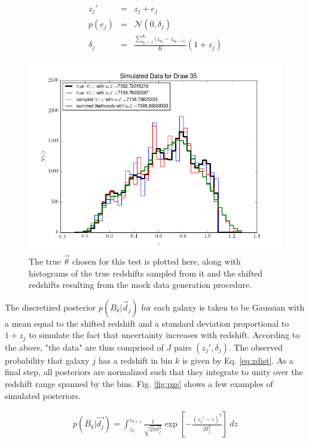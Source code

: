 \documentclass[12pt, onecolumn]{emulateapj}
\begin{document}
\begin{mathletters}
\begin{eqnarray}
\label{eq:zshift}
z_{j}' &=& z_{j}+e_{j}\\
p(e_{j}) &=& \mathcal{N}(0,\delta_{j})\nonumber\\
\delta_{j} &=& \frac{\sum_{b_{k}=1}^{K}(z_{b_{k}}-z_{b_{k}-1)}}{K}(1+z_{j})\nonumber
\end{eqnarray}
\end{mathletters}

\begin{figure}
\label{fig:samples}
\includegraphics[scale=0.5]{exdata.png}
\caption{The true $\vec{\theta}$ chosen for this test is plotted here, along with histograms of the true redshifts sampled from it and the shifted redshifts resulting from the mock data generation procedure.}
\end{figure}

The discretized posterior $p(B_{k}|\vec{d}_{j})$ for each galaxy is taken to be Gaussian with a mean equal to the shifted redshift and a standard deviation proportional to $1+z_{j}$ to simulate the fact that uncertainty increases with redshift.  According to the above, "the data" are thus comprised of $J$ pairs $(z_{j}',\delta_{j})$.  The observed probability that galaxy $j$ has a redshift in bin $k$ is given by Eq. \ref{eq:zdist}.  As a final step, all posteriors are normalized such that they integrate to unity over the redshift range spanned by the bins.  Fig. \ref{fig:pzs} shows a few examples of simulated posteriors.

\begin{eqnarray}
\label{eq:zdist}
p(B_{k}|\vec{d_{j}}) = \int_{z_{k}}^{z_{k+1}} \frac{1}{\sqrt{2\pi\delta_{j}^{2}}}\exp\left[-\frac{(z_{j}'-z)^{2}}{2\delta_{j}^{2}}\right]\ dz
\end{eqnarray}
\end{document}
